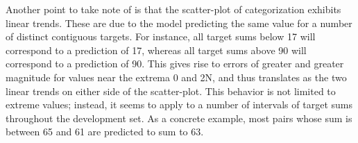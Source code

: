 \documentclass[twocolumn]{article}
\begin{document}
Another point to take note of is that the scatter-plot of categorization exhibits linear trends.
These are due to the model predicting the same value for a number of distinct contiguous targets.
For instance, all target sums below 17 will correspond to a prediction of 17, whereas all target sums above 90 will correspond to a prediction of 90.
This gives rise to errors of greater and greater magnitude for values near the extrema 0 and 2N, and thus translates as the two linear trends on either side of the scatter-plot.
This behavior is not limited to extreme values; instead, it seems to apply to a number of intervals of target sums throughout the development set.
As a concrete example, most pairs whose sum is between 65 and 61 are predicted to sum to 63.

\begin{table}%
    \centering
    \qquad
    \caption{\label{tab:topo} Topographic similarity scores}
\end{table}
\end{document}
